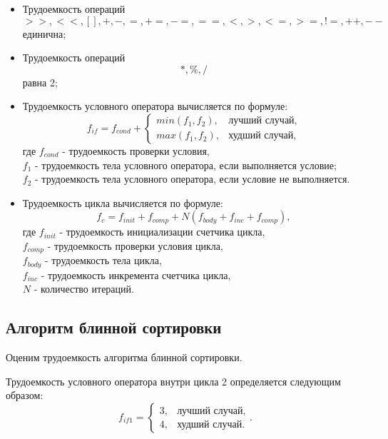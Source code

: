 \begin{itemize}
	\item Трудоемкость операций
	\begin{equation}\label{o1}
	>>, <<, [], +, -, =, +=, -=, ==, <, >, <=, >=, !=, ++, --
	\end{equation}
	единична;
	\item Трудоемкость операций
	\begin{equation}\label{o2}
		*, \%, /
	\end{equation}
	равна 2;
	\item Трудоемкость условного оператора вычисляется по формуле:
	\begin{equation}\label{oif}
		f_{if} = f_{cond} + 
		\begin{cases}
			min(f_1, f_2), & \text{лучший случай}, \\
			max(f_1, f_2), & \text{худший случай},
		\end{cases}
	\end{equation}
	где $f_{cond}$ - трудоемкость проверки условия,\\\text{~~~~~}$f_1$ - трудоемкость тела условного оператора, если выполняется условие;\\\text{~~~~~}$f_2$ - трудоемкость тела условного оператора, если условие не выполняется.
	\item Трудоемкость цикла вычисляется по формуле:
	\begin{equation}\label{oc}
	f_c = f_{init} + f_{comp} + N(f_{body} + f_{inc} + f_{comp}),
	\end{equation}
	где $f_{init}$ - трудоемкость инициализации счетчика цикла,\\\text{~~~~~}$f_{comp}$ - трудоемкость проверки условия цикла,\\\text{~~~~~}$f_{body}$ - трудоемкость тела цикла,\\\text{~~~~~}$f_{inc}$ - трудоемкость инкремента счетчика цикла,\\\text{~~~~~}$N$ - количество итераций.
\end{itemize}

\subsection{Алгоритм блинной сортировки}

Оценим трудоемкость алгоритма блинной сортировки.

Трудоемкость условного оператора внутри цикла 2 определяется следующим образом:
\begin{equation}\label{psif1}
	f_{if1} =
	\begin{cases}
		3, & \text{лучший случай}, \\
		4, & \text{худший случай}.
	\end{cases}.
\end{equation}

